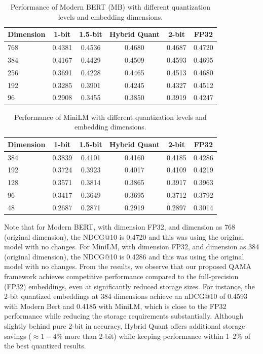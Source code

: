 \begin{table}[ht]
\caption{Performance of Modern BERT (MB) with different quantization levels and embedding dimensions.}
\label{tab:mb_main_results}
\centering
\begin{tabular}{lccccc}
\toprule
\textbf{Dimension} & \textbf{1-bit} & \textbf{1.5-bit} & \textbf{Hybrid Quant} & \textbf{2-bit} & \textbf{FP32} \\
\midrule
768 & 0.4381 & 0.4536 & 0.4680 & 0.4687 & 0.4720 \\
384 & 0.4167 & 0.4429 & 0.4509 & 0.4593 & 0.4695 \\
256 & 0.3691 & 0.4228 & 0.4465 & 0.4513 & 0.4680 \\
192 & 0.3285 & 0.3901 & 0.4245 & 0.4327 & 0.4512 \\
96 & 0.2908 & 0.3455 & 0.3850 & 0.3919 & 0.4247 \\
\bottomrule
\end{tabular}
\end{table}

\begin{table}[ht]
\caption{Performance of MiniLM with different quantization levels and embedding dimensions.}
\label{tab:minilm_main_results}
\centering
\begin{tabular}{lccccc}
\toprule
\textbf{Dimension} & \textbf{1-bit} & \textbf{1.5-bit} & \textbf{Hybrid Quant} & \textbf{2-bit} & \textbf{FP32} \\
\midrule
384 & 0.3839 & 0.4101 & 0.4160 & 0.4185 & 0.4286 \\
192 & 0.3724 & 0.3923 & 0.4017 & 0.4109 & 0.4219 \\
128 & 0.3571 & 0.3814 & 0.3865 & 0.3917 & 0.3963 \\
96 & 0.3417 & 0.3649 & 0.3695 & 0.3712 & 0.3792 \\
48 & 0.2687 & 0.2871 & 0.2919 & 0.2897 & 0.3014 \\
\bottomrule
\end{tabular}
\end{table}

Note that for Modern BERT, with dimension FP32, and dimension as 768 (original dimension), the NDCG@10 is 0.4720 and this was using the original model with no changes. 
For MiniLM, with dimension FP32, and dimension as 384 (original dimension), the NDCG@10 is 0.4286 and this was using the original model with no changes.
From the results, we observe that our proposed QAMA framework achieves competitive performance compared to the full-precision (FP32) embeddings, even at significantly reduced storage sizes. 
For instance, the 2-bit quantized embeddings at 384 dimensions achieve an nDCG@10 of 0.4593 with Modern Bert and 0.4185 with MiniLM, which is close to the FP32 performance while reducing the storage requirements substantially.
Although slightly behind pure 2-bit in accuracy, Hybrid Quant offers additional storage savings (\(\approx 1{-}4\%\) more than 2-bit) while keeping performance within 1--2\% of the best quantized results. 


